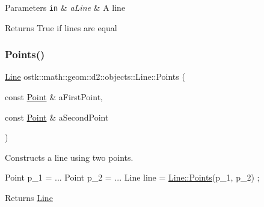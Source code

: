\begin{DoxyParams}[1]{Parameters}
\mbox{\tt in}  & {\em a\+Line} & A line \\
\hline
\end{DoxyParams}
\begin{DoxyReturn}{Returns}
True if lines are equal 
\end{DoxyReturn}
\mbox{\label{classostk_1_1math_1_1geom_1_1d2_1_1objects_1_1_line_a572c81bd8c94574a0f7d53fc5578daa4}} 
\subsubsection{\texorpdfstring{Points()}{Points()}}
{\footnotesize\ttfamily \hyperlink{classostk_1_1math_1_1geom_1_1d2_1_1objects_1_1_line}{Line} ostk\+::math\+::geom\+::d2\+::objects\+::\+Line\+::\+Points (\begin{DoxyParamCaption}\item[{const \hyperlink{classostk_1_1math_1_1geom_1_1d2_1_1objects_1_1_point}{Point} \&}]{a\+First\+Point,  }\item[{const \hyperlink{classostk_1_1math_1_1geom_1_1d2_1_1objects_1_1_point}{Point} \&}]{a\+Second\+Point }\end{DoxyParamCaption})\hspace{0.3cm}{\ttfamily [static]}}



Constructs a line using two points. 


\begin{DoxyCode}
Point p\_1 = ...
Point p\_2 = ...
Line line = \hyperlink{classostk_1_1math_1_1geom_1_1d2_1_1objects_1_1_line_a572c81bd8c94574a0f7d53fc5578daa4}{Line::Points}(p\_1, p\_2) ;
\end{DoxyCode}


\begin{DoxyReturn}{Returns}
\hyperlink{classostk_1_1math_1_1geom_1_1d2_1_1objects_1_1_line}{Line} 
\end{DoxyReturn}
\mbox{\label{classostk_1_1math_1_1geom_1_1d2_1_1objects_1_1_line_a8bd64cd001e4c05e3cdf7ebd7e520cb7}} 
